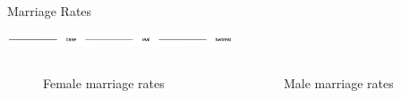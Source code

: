 \documentclass{beamer}
\begin{document}
		\begin{frame}{Marriage Rates}
			\begin{center}
				\includegraphics[width=0.5\textwidth]{Images/legend.png}
			\end{center}

			\begin{columns}
				\begin{column}{0.5\paperwidth}
					\begin{figure}
						\caption{Female marriage rates}
					\end{figure}
				\end{column}

				\begin{column}{0.5\paperwidth}
					\begin{figure}
						\caption{Male marriage rates}
					\end{figure}
				\end{column}
			\end{columns}	


\end{frame}
\end{document}
